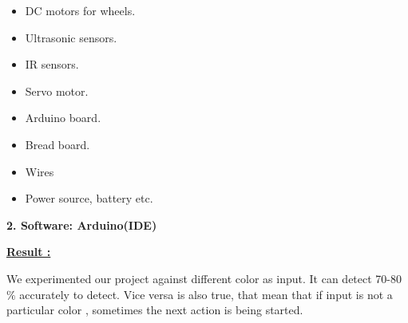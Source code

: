 \documentclass[12pt]{article}
\begin{document}
\begin{itemize}
	\item {\fontsize{14pt}{16.8pt}\selectfont DC motors for wheels.\par}\par

	\item {\fontsize{14pt}{16.8pt}\selectfont Ultrasonic sensors.\par}\par

	\item {\fontsize{14pt}{16.8pt}\selectfont IR sensors.\par}\par

	\item {\fontsize{14pt}{16.8pt}\selectfont Servo motor.\par}\par

	\item {\fontsize{14pt}{16.8pt}\selectfont Arduino board.\par}\par

	\item {\fontsize{14pt}{16.8pt}\selectfont Bread board.\par}\par

	\item {\fontsize{14pt}{16.8pt}\selectfont Wires\par}\par

	\item {\fontsize{14pt}{16.8pt}\selectfont Power source, battery etc.\par}
\end{itemize}\par

{\fontsize{18pt}{21.6pt}\selectfont \textbf{2. Software: Arduino(IDE)\tab}\par}\par

{\fontsize{17pt}{20.4pt}\selectfont \textbf{\uline{Result :} }{\fontsize{14pt}{16.8pt}\selectfont We experimented our project against different color as input. It can detect 70-80$\%$  accurately to detect. Vice versa is also true, that mean that if input is not a particular color , sometimes the next action is being started.\par}\par}\par
\end{document}
